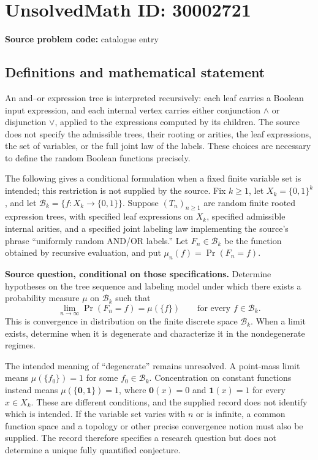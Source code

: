 \documentclass[11pt]{article}
\begin{document}
\section*{UnsolvedMath ID: 30002721}
\textbf{Source problem code:} catalogue entry
\subsection{Definitions and mathematical statement}
An and--or expression tree is interpreted recursively: each leaf carries a Boolean input expression, and each internal vertex carries either conjunction \(\wedge\) or disjunction \(\vee\), applied to the expressions computed by its children. The source does not specify the admissible trees, their rooting or arities, the leaf expressions, the set of variables, or the full joint law of the labels. These choices are necessary to define the random Boolean functions precisely.

The following gives a conditional formulation when a fixed finite variable set is intended; this restriction is not supplied by the source. Fix \(k\geq 1\), let \(X_k=\{0,1\}^k\), and let \(\mathcal B_k=\{f:X_k\to\{0,1\}\}\). Suppose \((T_n)_{n\geq1}\) are random finite rooted expression trees, with specified leaf expressions on \(X_k\), specified admissible internal arities, and a specified joint labeling law implementing the source's phrase ``uniformly random AND/OR labels.'' Let \(F_n\in\mathcal B_k\) be the function obtained by recursive evaluation, and put \(\mu_n(f)=\Pr(F_n=f)\).

\textbf{Source question, conditional on those specifications.} Determine hypotheses on the tree sequence and labeling model under which there exists a probability measure \(\mu\) on \(\mathcal B_k\) such that
\[
\lim_{n\to\infty}\Pr(F_n=f)=\mu(\{f\})\qquad\text{for every }f\in\mathcal B_k.
\]
This is convergence in distribution on the finite discrete space \(\mathcal B_k\). When a limit exists, determine when it is degenerate and characterize it in the nondegenerate regimes.

The intended meaning of ``degenerate'' remains unresolved. A point-mass limit means \(\mu(\{f_0\})=1\) for some \(f_0\in\mathcal B_k\). Concentration on constant functions instead means \(\mu(\{\mathbf 0,\mathbf 1\})=1\), where \(\mathbf 0(x)=0\) and \(\mathbf 1(x)=1\) for every \(x\in X_k\). These are different conditions, and the supplied record does not identify which is intended. If the variable set varies with \(n\) or is infinite, a common function space and a topology or other precise convergence notion must also be supplied. The record therefore specifies a research question but does not determine a unique fully quantified conjecture.
\end{document}
